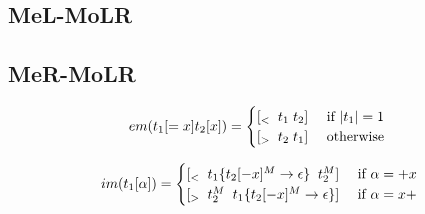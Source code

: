 \documentclass[12pt]{article}
\begin{document}
\begin{landscape}
\newpage

\subsection{MeL-MoLR}

\subsection{MeR-MoLR}

\begin{equation}
em(t_1[=x]t_2[x])= 
\begin{cases}
[_< \;\; t_1\;t_2] & $ if $ |t_1| = 1 \\
[_> \;\; t_2\; t_1] & $ otherwise $
\end{cases}
\end{equation}

\begin{equation}
im(t_1[\alpha]) =
\begin{cases}
[_< \;\; t_1\{t_2[-x]^M \rightarrow \epsilon\} \;\; t_2^M] & $ if $\alpha = +x \\
[_> \;\; t_2^M \;\; t_1\{t_2[-x]^M \rightarrow \epsilon\}] & $ if $\alpha= x+
\end{cases}
\end{equation}



\end{landscape}
\end{document}
